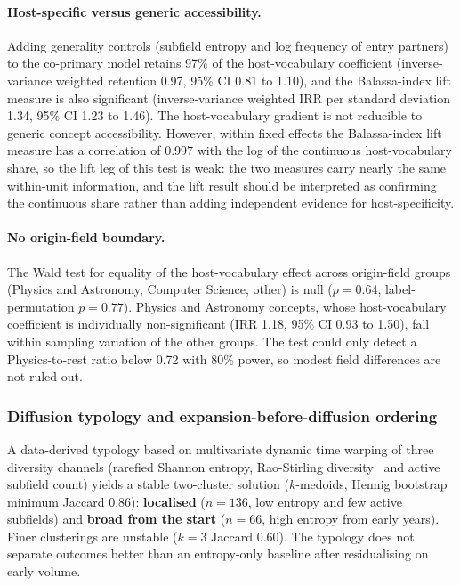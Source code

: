 \documentclass[11pt,letterpaper]{article}
\begin{document}
\paragraph{Host-specific versus generic accessibility.} Adding generality controls (subfield entropy and log
frequency of entry partners) to the co-primary model retains 97\% of the host-vocabulary coefficient
(inverse-variance weighted retention 0.97, 95\% CI 0.81 to 1.10), and the Balassa-index lift measure is also
significant (inverse-variance weighted IRR per standard deviation 1.34, 95\% CI 1.23 to 1.46). The
host-vocabulary gradient is not reducible to generic concept accessibility. However, within fixed effects the
Balassa-index lift measure has a correlation of 0.997 with the log of the continuous host-vocabulary share,
so the lift leg of this test is weak: the two measures carry nearly the same within-unit information, and the
lift result should be interpreted as confirming the continuous share rather than adding independent evidence
for host-specificity.

\paragraph{No origin-field boundary.} The Wald test for equality of the host-vocabulary effect across
origin-field groups (Physics and Astronomy, Computer Science, other) is null ($p = 0.64$, label-permutation
$p = 0.77$). Physics and Astronomy concepts, whose host-vocabulary coefficient is individually non-significant
(IRR 1.18, 95\% CI 0.93 to 1.50), fall within sampling variation of the other groups. The test could
only detect a Physics-to-rest ratio below 0.72 with 80\% power, so modest field differences are not ruled out.

\subsubsection{Diffusion typology and expansion-before-diffusion ordering}
\label{sec:rq2_typology}

A data-derived typology based on multivariate dynamic time warping of three diversity channels (rarefied
Shannon entropy, Rao-Stirling diversity~\citep{Stirling2007} and active subfield count) yields a stable
two-cluster solution ($k$-medoids, Hennig bootstrap~\citep{Hennig2007} minimum Jaccard 0.86):
\textbf{localised} ($n = 136$, low entropy and few active subfields) and \textbf{broad from the start}
($n = 66$, high entropy from early years). Finer clusterings are unstable ($k = 3$ Jaccard 0.60). The typology
does not separate outcomes better than an entropy-only baseline after residualising on early volume.
\end{document}
